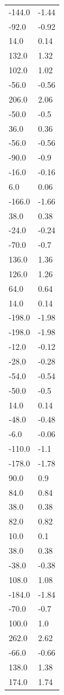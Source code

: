 \begin{longtable}{ll}
-144.0 & -1.44 \\
-92.0 & -0.92 \\
14.0 & 0.14 \\
132.0 & 1.32 \\
102.0 & 1.02 \\
-56.0 & -0.56 \\
206.0 & 2.06 \\
-50.0 & -0.5 \\
36.0 & 0.36 \\
-56.0 & -0.56 \\
-90.0 & -0.9 \\
-16.0 & -0.16 \\
6.0 & 0.06 \\
-166.0 & -1.66 \\
38.0 & 0.38 \\
-24.0 & -0.24 \\
-70.0 & -0.7 \\
136.0 & 1.36 \\
126.0 & 1.26 \\
64.0 & 0.64 \\
14.0 & 0.14 \\
-198.0 & -1.98 \\
-198.0 & -1.98 \\
-12.0 & -0.12 \\
-28.0 & -0.28 \\
-54.0 & -0.54 \\
-50.0 & -0.5 \\
14.0 & 0.14 \\
-48.0 & -0.48 \\
-6.0 & -0.06 \\
-110.0 & -1.1 \\
-178.0 & -1.78 \\
90.0 & 0.9 \\
84.0 & 0.84 \\
38.0 & 0.38 \\
82.0 & 0.82 \\
10.0 & 0.1 \\
38.0 & 0.38 \\
-38.0 & -0.38 \\
108.0 & 1.08 \\
-184.0 & -1.84 \\
-70.0 & -0.7 \\
100.0 & 1.0 \\
262.0 & 2.62 \\
-66.0 & -0.66 \\
138.0 & 1.38 \\
174.0 & 1.74 \\

\end{longtable}
